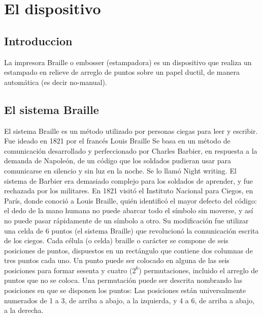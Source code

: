 
\chapter{El dispositivo}
\section{Introduccion} 
La impresora Braille o embosser (estampadora) es un dispositivo que realiza un
estampado en relieve de arreglo de puntos sobre un papel ductil, de manera 
autom\'atica (es decir no-manual).
\section{El sistema Braille}
El sistema Braille es un m\'etodo utilizado por personas ciegas para leer y 
escribir. Fue ideado en 1821 por el franc\'es Louis Braille
Se basa en un m\'etodo de comunicaci\'on desarrollado y perfeccionado por 
Charles Barbier, en respuesta a la demanda de Napole\'on, de un c\'odigo que
los soldados pudieran usar para comunicarse en silencio y sin luz en la noche.
Se lo llam\'o Night writing. El sistema de Barbier era demasiado complejo para
los soldados de aprender, y fue rechazada por los militares. En 1821 visit\'o
el Instituto Nacional para Ciegos, en Par\'is, donde conoci\'o a Louis Braille,
qui\'en identific\'o el mayor defecto del c\'odigo: el dedo de la mano humana
no puede abarcar todo el s\'imbolo sin moverse, y as\'i no puede pasar
r\'apidamente de un s\'imbolo a otro.
Su modificaci\'on fue utilizar una celda de 6 puntos (el sistema Braille) que 
revolucion\'o la comunicaci\'on escrita de los ciegos.
Cada c\'elula (o celda) braille o car\'acter se compone de seis posiciones de 
puntos, dispuestos en un rect\'angulo que contiene dos columnas de tres puntos
cada uno. Un punto puede ser colocado en alguna de las seis posiciones para
formar sesenta y cuatro ($2^{6}$) permutaciones, incluido el arreglo de puntos
que no se coloca. Una permutaci\'on puede ser descrita nombrando las posiciones
en que se disponen los puntos: Las posiciones est\'an universalmente numerados
de 1 a 3, de arriba a abajo, a la izquierda, y 4 a 6, de arriba a abajo, a la
derecha. 

